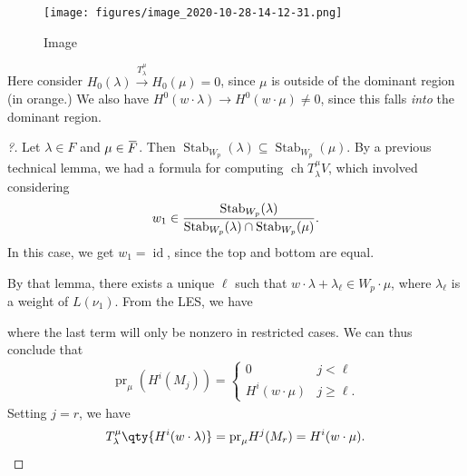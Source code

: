 \begin{example}[?]

\begin{figure}
\centering
\texttt{[image: figures/image\_2020-10-28-14-12-31.png]}
\caption{Image}
\end{figure}

Here consider \(H_0(\lambda) \xrightarrow{T_\lambda^\mu} H_0(\mu) = 0\),
since \(\mu\) is outside of the dominant region (in orange.) We also
have \(H^0(w\cdot \lambda) \to H^0(w\cdot \mu) \neq 0\), since this
falls \emph{into} the dominant region.

\end{example}

\begin{proof}[?]

Let \(\lambda \in F\) and
\(\mu\in\mkern 1.5mu\overline{\mkern-1.5muF\mkern-1.5mu}\mkern 1.5mu\).
Then
\({\operatorname{Stab}}_{W_p}(\lambda) \subseteq {\operatorname{Stab}}_{W_p}(\mu)\).
By a previous technical lemma, we had a formula for computing
\(\operatorname{ch}T_\lambda^\mu V\), which involved considering
\begin{align*}  
w_1 \in {{\operatorname{Stab}}_{W_p}(\lambda) \over {\operatorname{Stab}}_{W_p}(\lambda) \cap{\operatorname{Stab}}_{W_p}(\mu)}
.\end{align*}
In this case, we get \(w_1 = \operatorname{id}\), since the top and
bottom are equal.

By that lemma, there exists a unique \(\ell\) such that
\(w\cdot \lambda + \lambda_\ell \in W_p\cdot \mu\), where
\(\lambda_\ell\) is a weight of \(L(\nu_1)\). From the LES, we have

\begin{center}
\end{center}

where the last term will only be nonzero in restricted cases. We can
thus conclude that
\begin{align*}  
{\operatorname{pr}}_\mu(H^i(M_j))  =
\begin{cases}
0 & j< \ell \\
H^i(w\cdot \mu) & j\geq \ell.
\end{cases}
\end{align*}
Setting \(j=r\), we have
\begin{align*}  
T_\lambda^\mu \qty{H^i(w\cdot\lambda)} = {\operatorname{pr}}_\mu H^j(M_r) = H^i(w\cdot \mu)
.\end{align*}

\end{proof}


